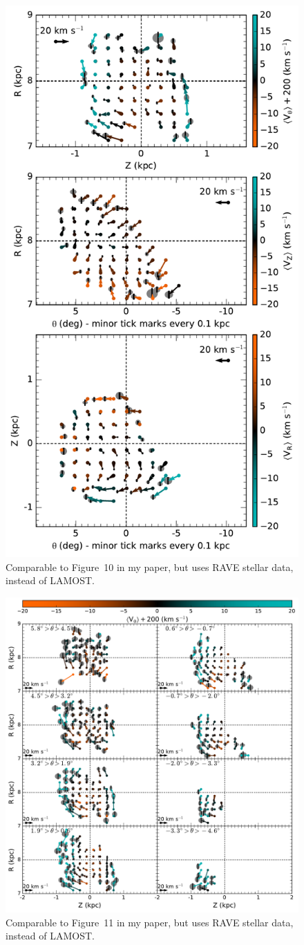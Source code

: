 \documentclass{article}
\begin{document}
\begin{figure}
\centering
\includegraphics[width=.7\textwidth]{sideviewR.pdf}
\caption{
	Comparable to Figure~10 in my paper, but uses RAVE stellar data, instead of LAMOST. 
	\label{fig:sideviewR}
}
\end{figure}

\begin{figure}
\centering
\includegraphics[width=\textwidth]{stepthetaR.pdf}
\caption{
	Comparable to Figure~11 in my paper, but uses RAVE stellar data, instead of LAMOST. 
	\label{fig:stepthetaR}
}
\end{figure}
\end{document}
